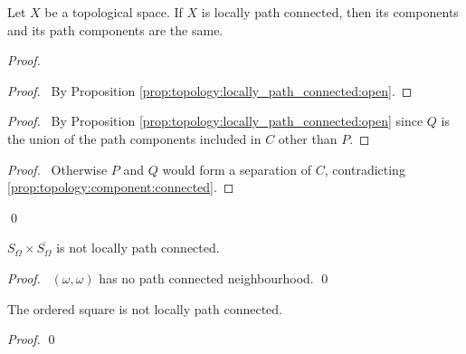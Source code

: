 \begin{thm}[AC]
  Let $X$ be a topological space. If $X$ is locally path connected, then its
  components and its path components are the same.
\end{thm}

\begin{proof}
  \pf
  \begin{proof}
    \pf\ By Proposition \ref{prop:topology:locally_path_connected:open}.
  \end{proof}
  \begin{proof}
    \pf\ By Proposition \ref{prop:topology:locally_path_connected:open} since
    $Q$ is the union of the path components included in $C$ other than $P$.
  \end{proof}
  \begin{proof}
    \pf\ Otherwise $P$ and $Q$ would form a separation of $C$, contradicting
    \ref{prop:topology:component:connected}.
  \end{proof}
  \qed
\end{proof}

 \begin{prop}
 $S_\Omega \times \overline{S_\Omega}$ is not locally path connected.
\end{prop}

\begin{proof}
\pf\ $(\omega, \omega)$ has no path connected neighbourhood. \qed
\end{proof}

\begin{prop}
The ordered square is not locally path connected.
\end{prop}

\begin{proof}
\pf
{}
\qed
\end{proof}

